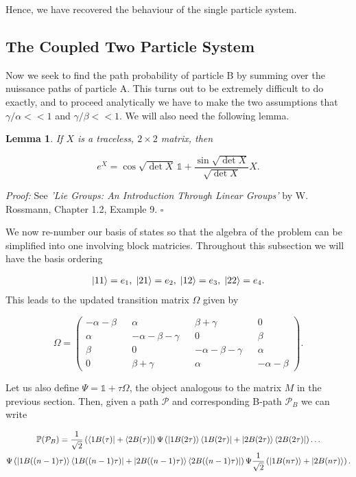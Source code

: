\documentclass{article}
\newtheorem{lemma}[theorem]{Lemma}
\begin{document}
Hence, we have recovered the behaviour of the single particle system.
\newpage
\subsection{The Coupled Two Particle System}
Now we seek to find the path probability of particle B by summing over the nuissance paths of particle A. This turns out to be extremely difficult to do exactly, and to proceed analytically we have to make the two assumptions that $\gamma/\alpha << 1$ and $\gamma/\beta << 1$. We will also need the following lemma.


\begin{lemma}\label{exp_of_2x2}
  If $X$ is a traceless, $2 \times 2$ matrix, then

  $$ e^X = \cos \sqrt{\det X}\,\mathbb{1} + \frac{\sin \sqrt{\det X}}{\sqrt{\det X}}X.$$
\end{lemma}
\textit{Proof:}
  See \textit{'Lie Groups: An Introduction Through Linear Groups'} by W. Rossmann, Chapter 1.2, Example 9. \hfill $\square$

\vspace{10pt}
We now re-number our basis of states so that the algebra of the problem can be simplified into one involving block matricies. Throughout this subsection we will have the basis ordering

\begin{align}
  \ket{11} = e_1, \; \nonumber
  \ket{21} = e_2, \;  \nonumber
  \ket{12} = e_3, \;  \nonumber
  \ket{22} = e_4.
\end{align}
This leads to the updated transition matrix $\Omega$ given by

\begin{equation}
  \Omega = \begin{pmatrix} -\alpha - \beta && \alpha && \beta + \gamma && 0 \\
  \alpha && -\alpha -\beta -\gamma && 0 && \beta \\
  \beta && 0 && -\alpha-\beta-\gamma && \alpha \\
  0 && \beta+\gamma && \alpha && -\alpha-\beta \end{pmatrix}.
\end{equation}

Let us also define $\Psi = \mathbb{1} + \tau\Omega$, the object analogous to the matrix $M$ in the previous section. Then, given a path $\mathcal{P}$ and corresponding B-path $\mathcal{P}_B$ we can write

\begin{gather} \label{path_prob_B}
  \mathbb{P}(\mathcal{P}_B) = \frac{1}{\sqrt{2}}\left(\bra{1B(\tau)}+\bra{2B(\tau)}\right)\Psi\left(\ket{1B(2\tau)}\bra{1B(2\tau)}+\ket{2B(2\tau)}\bra{2B(2\tau)}\right)\ldots \\ \nonumber \Psi \left(\ket{1B((n-1)\tau)}\bra{1B((n-1)\tau)}+\ket{2B((n-1)\tau)}\bra{2B((n-1)\tau)}\right)  \Psi \frac{1}{\sqrt{2}}\left(\ket{1B(n\tau)}+\ket{2B(n\tau)}\right).
\end{gather}
\end{document}
